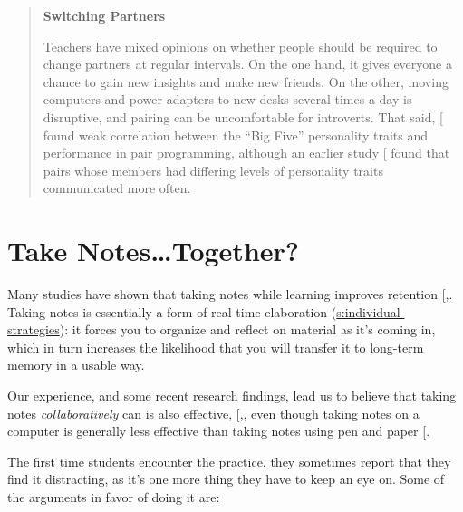 \begin{quote}\setlength{\parindent}{0pt}
\textbf{Switching Partners}

Teachers have mixed opinions on whether people should be required to
change partners at regular intervals. On the one hand, it gives
everyone a chance to gain new insights and make new friends. On the
other, moving computers and power adapters to new desks several times
a day is disruptive, and pairing can be uncomfortable for introverts.
That said, {[}\protect[\hyperlink{b:Hann2010}{Hann2010}]{]} found weak correlation between the ``Big
Five'' personality traits and performance in pair programming, although
an earlier study {[}\protect[\hyperlink{b:Wall2009}{Wall2009}]{]} found that pairs whose members had
differing levels of personality traits communicated more often.
\end{quote}

\section{Take Notes\ldots{}Together?}\label{s:classroom-notetaking}

Many studies have shown that taking notes while learning improves
retention {[},\protect[\hyperlink{b:Boha2011}{Boha2011}]{]}. Taking notes is essentially a
form of real-time elaboration (\protect\hyperlink{SECTION}{s:individual-strategies}): it
forces you to organize and reflect on material as it's coming in, which
in turn increases the likelihood that you will transfer it to long-term
memory in a usable way.

Our experience, and some recent research findings, lead us to believe
that taking notes \emph{collaboratively} can is also effective,
{[},\protect[\hyperlink{b:Yang2015}{Yang2015}]{]}, even though taking notes on a
computer is generally less effective than taking notes using pen and
paper {[}\protect[\hyperlink{b:Muel2014}{Muel2014}]{]}.

The first time students encounter the practice, they sometimes report
that they find it distracting, as it's one more thing they have to keep
an eye on. Some of the arguments in favor of doing it are:

